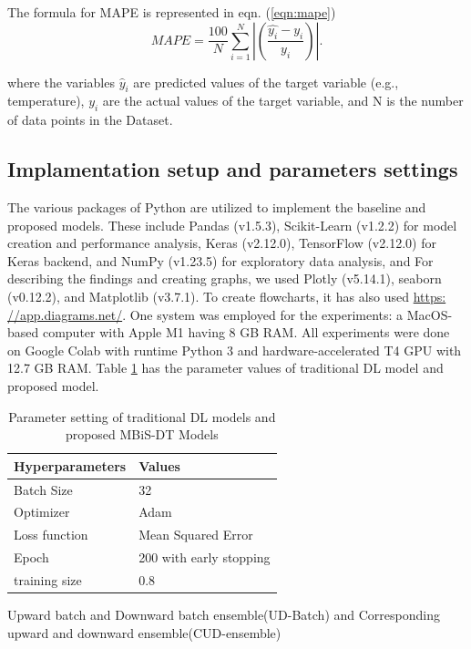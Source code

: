 \documentclass[sn-mathphys,Numbered]{sn-jnl}
\theoremstyle{thmstyleone}
\theoremstyle{thmstyletwo}
\theoremstyle{thmstylethree}
\begin{document}
The formula for MAPE is represented in eqn. (\ref{eqn:mape})
\begin{equation}
\label{eqn:mape}
MAPE = \frac{100}{N} \sum_{i=1}^{N} \left|(\frac{\hat{y_{i}} - y_{i}}{y_i})\right| .
\end{equation}


where the variables $\hat{y}_i$ are predicted values of the target variable (e.g., temperature), $y_i$ are the actual values of the target variable, and N is the number of data points in the Dataset.



\subsection{Implamentation setup and parameters settings}
The various packages of Python are utilized to implement the baseline and proposed models. These include Pandas (v1.5.3), Scikit-Learn (v1.2.2) for model creation and performance analysis, Keras (v2.12.0), TensorFlow (v2.12.0) for Keras backend, and NumPy (v1.23.5) for exploratory data analysis, and For describing the findings and creating graphs, we used Plotly (v5.14.1), seaborn (v0.12.2), and Matplotlib (v3.7.1). To create flowcharts, it has also used \href{https: //app.diagrams.net/}{https: //app.diagrams.net/}. One system was employed for the experiments: a MacOS-based computer with Apple M1 having 8 GB RAM. All experiments were done on Google Colab with runtime Python 3 and hardware-accelerated T4 GPU with 12.7 GB RAM. Table \ref{tab: my-table} has the parameter values of traditional DL model and proposed model.

\begin{table}[h!]
\centering
\caption{Parameter setting of traditional DL models and proposed MBiS-DT Models}
\label{tab: my-table}
\begin{tabular}{ll}
\hline Hyperparameters & Values \\ \hline
Batch Size & 32 \\
Optimizer & Adam \\
Loss function & Mean Squared Error \\
Epoch & 200 with early stopping \\
training size & 0.8 \\ \hline
\end{tabular}
\end{table}
Upward batch and Downward batch ensemble(UD-Batch) and Corresponding upward and downward ensemble(CUD-ensemble)
\end{document}
